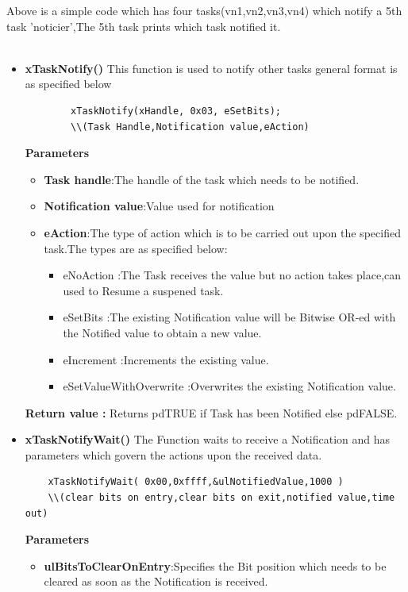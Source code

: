 \documentclass[11pt,a4paper]{book}
\begin{document}
   Above is a simple code which has four tasks(vn1,vn2,vn3,vn4) which notify a 5th task 'noticier',The 5th task prints which task notified it. 
   \\
   \\
   \begin{itemize}
   	\item \textbf{xTaskNotify()}
   	This function is used to notify other tasks general format is as specified below 
   		\begin{lstlisting}
   		xTaskNotify(xHandle, 0x03, eSetBits);
   		\\(Task Handle,Notification value,eAction)
   		\end{lstlisting}
  
  
   	\textbf{Parameters}
   	\begin{itemize}
   		\item \textbf{Task handle}:The handle of the task which needs to be notified.
   		\item \textbf{Notification value}:Value used for notification
   		\item \textbf{eAction}:The type of action which is to be carried out upon the specified task.The types are as specified below:
		   		\begin{itemize}
		   			\item eNoAction :The Task receives the value but no action takes place,can used to Resume a suspened task.
		   			
		   			\item eSetBits :The existing Notification value will be Bitwise OR-ed with the Notified value to obtain a new value.
		   			
		   			\item eIncrement :Increments the existing value.
		   			
		   			\item eSetValueWithOverwrite :Overwrites the existing Notification value.
		   			
		   			
		   		\end{itemize}
		   		
   	\end{itemize}
   	
   	\textbf{Return value :}
   	  	Returns pdTRUE if Task has been Notified else pdFALSE.
   	
   	\item \textbf{xTaskNotifyWait() } The Function waits to receive a Notification and has parameters which govern the actions upon the received data.
   	\begin{lstlisting}
   	xTaskNotifyWait( 0x00,0xffff,&ulNotifiedValue,1000 )
   	\\(clear bits on entry,clear bits on exit,notified value,time out)
   	\end{lstlisting}
   	\textbf{Parameters}
   	\begin{itemize}
   		\item \textbf{ulBitsToClearOnEntry}:Specifies the Bit position which needs to be cleared as soon as the Notification is received.
   	    

\end{itemize}
\end{itemize}
\end{document}
